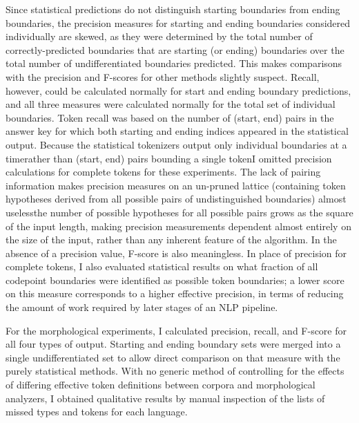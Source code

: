 Since statistical predictions do not distinguish starting boundaries from ending boundaries, the precision measures for starting and ending boundaries considered individually are skewed, as they were determined by the total number of correctly-predicted boundaries that are starting (or ending) boundaries over the total number of undifferentiated boundaries predicted. This makes comparisons with the precision and F-scores for other methods slightly suspect. Recall, however, could be calculated normally for start and ending boundary predictions, and all three measures were calculated normally for the total set of individual boundaries. Token recall was based on the number of (start, end) pairs in the answer key for which both starting and ending indices appeared in the statistical output. Because the statistical tokenizers output only individual boundaries at a time\textemdash rather than (start, end) pairs bounding a single token\textemdash I omitted precision calculations for complete tokens for these experiments. The lack of pairing information makes precision measures on an un-pruned lattice (containing token hypotheses derived from all possible pairs of undistinguished boundaries) almost useless\textemdash the number of possible hypotheses for all possible pairs grows as the square of the input length, making precision measurements dependent almost entirely on the size of the input, rather than any inherent feature of the algorithm. In the absence of a precision value, F-score is also meaningless. In place of precision for complete tokens, I also evaluated statistical results on what fraction of all codepoint boundaries were identified as possible token boundaries; a lower score on this measure corresponds to a higher effective precision, in terms of reducing the amount of work required by later stages of an NLP pipeline.

For the morphological experiments, I calculated precision, recall, and F-score for all four types of output. Starting and ending boundary sets were merged into a single undifferentiated set to allow direct comparison on that measure with the purely statistical methods. With no generic method of controlling for the effects of differing effective token definitions between corpora and morphological analyzers, I obtained qualitative results by manual inspection of the lists of missed types and tokens for each language.


